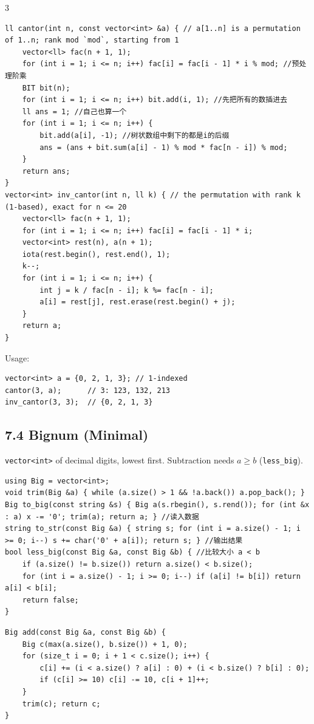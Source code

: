 \documentclass[8pt]{extarticle}
\begin{document}
\begin{multicols*}{3}
\begin{lstlisting}
ll cantor(int n, const vector<int> &a) { // a[1..n] is a permutation of 1..n; rank mod `mod`, starting from 1
    vector<ll> fac(n + 1, 1);
    for (int i = 1; i <= n; i++) fac[i] = fac[i - 1] * i % mod; //预处理阶乘
    BIT bit(n);
    for (int i = 1; i <= n; i++) bit.add(i, 1); //先把所有的数插进去
    ll ans = 1; //自己也算一个
    for (int i = 1; i <= n; i++) {
        bit.add(a[i], -1); //树状数组中剩下的都是i的后缀
        ans = (ans + bit.sum(a[i] - 1) % mod * fac[n - i]) % mod;
    }
    return ans;
}
vector<int> inv_cantor(int n, ll k) { // the permutation with rank k (1-based), exact for n <= 20
    vector<ll> fac(n + 1, 1);
    for (int i = 1; i <= n; i++) fac[i] = fac[i - 1] * i;
    vector<int> rest(n), a(n + 1);
    iota(rest.begin(), rest.end(), 1);
    k--;
    for (int i = 1; i <= n; i++) {
        int j = k / fac[n - i]; k %= fac[n - i];
        a[i] = rest[j], rest.erase(rest.begin() + j);
    }
    return a;
}
\end{lstlisting}

Usage:

\begin{lstlisting}
vector<int> a = {0, 2, 1, 3}; // 1-indexed
cantor(3, a);      // 3: 123, 132, 213
inv_cantor(3, 3);  // {0, 2, 1, 3}
\end{lstlisting}

\subsection*{7.4 Bignum (Minimal)}

\texttt{vector<int>} of decimal digits, lowest first. Subtraction needs $a \ge b$ (\texttt{less\_big}).

\begin{lstlisting}
using Big = vector<int>;
void trim(Big &a) { while (a.size() > 1 && !a.back()) a.pop_back(); }
Big to_big(const string &s) { Big a(s.rbegin(), s.rend()); for (int &x : a) x -= '0'; trim(a); return a; } //读入数据
string to_str(const Big &a) { string s; for (int i = a.size() - 1; i >= 0; i--) s += char('0' + a[i]); return s; } //输出结果
bool less_big(const Big &a, const Big &b) { //比较大小 a < b
    if (a.size() != b.size()) return a.size() < b.size();
    for (int i = a.size() - 1; i >= 0; i--) if (a[i] != b[i]) return a[i] < b[i];
    return false;
}
\end{lstlisting}

\begin{lstlisting}
Big add(const Big &a, const Big &b) {
    Big c(max(a.size(), b.size()) + 1, 0);
    for (size_t i = 0; i + 1 < c.size(); i++) {
        c[i] += (i < a.size() ? a[i] : 0) + (i < b.size() ? b[i] : 0);
        if (c[i] >= 10) c[i] -= 10, c[i + 1]++;
    }
    trim(c); return c;
}
\end{lstlisting}


\end{multicols*}
\end{document}
